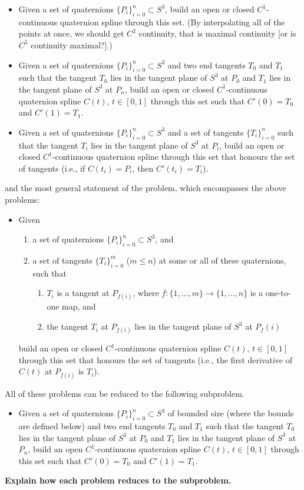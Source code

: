 \documentclass[12pt]{article}
\begin{document}
\begin{itemize}
\item 
Given a set of quaternions $\{P_i\}_{i=0}^n \subset S^3$,
build an open or closed $C^1$-continuous quaternion spline through this set.
(By interpolating all of the points at once, we should get $C^2$ continuity,
that is maximal continuity [or is $C^5$ continuity maximal?].)

\item 
Given a set of quaternions $\{P_i\}_{i=0}^n \subset S^3$
and two end tangents $T_0$ and $T_1$
such that the tangent $T_0$ lies in the tangent plane of $S^3$ at $P_0$
and $T_1$ lies in the tangent plane of $S^3$ at $P_n$,
build an open or closed $C^1$-continuous quaternion spline $C(t)$, $t \in [0,1]$ 
through this set such that $C'(0) = T_0$ and $C'(1) = T_1$.

\item 
Given a set of quaternions $\{P_i\}_{i=0}^n \subset S^3$
and a set of tangents $\{T_i\}_{i=0}^n$
such that the tangent $T_i$ lies in the tangent plane of $S^3$ at $P_i$,
build an open or closed $C^1$-continuous quaternion spline through this set
that honours the set of tangents (i.e., if $C(t_i) = P_i$, then $C'(t_i) = T_i$).
\end{itemize}
%
and the most general statement of the problem, which encompasses the above problems:
%
\begin{itemize}
\item
Given 
\begin{enumerate}
\item a set of quaternions $\{P_i\}_{i=0}^n \subset S^3$, and
\item a set of tangents $\{T_i\}_{i=0}^m$ ($m\leq n$) 
      at some or all of these quaternions, such that
\begin{enumerate}
\item
$T_i$ is a tangent at $P_{f(i)}$, 
where $f: \{1,\ldots,m\} \rightarrow \{1,\ldots,n\}$ is a one-to-one map, and
\item
the tangent $T_i$ at $P_{f(i)}$ lies in the tangent plane of $S^3$ at $P_f(i)$
\end{enumerate}
\end{enumerate}
build an open or closed $C^1$-continuous quaternion spline $C(t)$, $t \in [0,1]$ 
through this set that honours the set of tangents (i.e., the first derivative of $C(t)$
at $P_{f(i)}$ is $T_i$).
\end{itemize}
%
All of these problems can be reduced to the following subproblem.
%
\begin{itemize}
\item Given a set of quaternions $\{P_i\}_{i=0}^n \subset S^3$ 
of bounded size (where the bounds are defined below) 
and two end tangents $T_0$ and $T_1$
such that the tangent $T_0$ lies in the tangent plane of $S^3$ at $P_0$
and $T_1$ lies in the tangent plane of $S^3$ at $P_n$,
build an open $C^1$-continuous quaternion spline $C(t)$, $t \in [0,1]$ 
through this set such that $C'(0) = T_0$ and $C'(1) = T_1$.
\end{itemize}
{\bf Explain how each problem reduces to the subproblem.}
\end{document}
